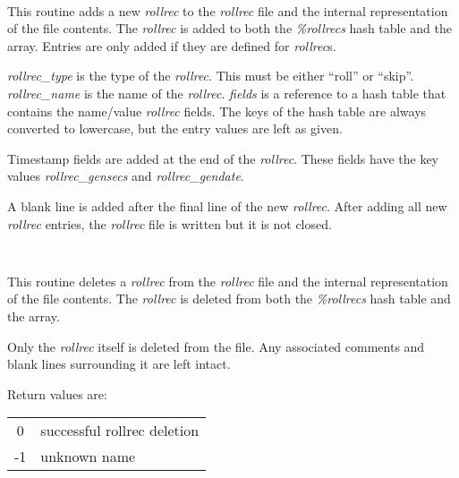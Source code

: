 \begin{description}

\item {}\verb" "

This routine adds a new {\it rollrec} to the {\it rollrec} file and the
internal representation of the file contents.  The {\it rollrec} is added to
both the {\it \%rollrecs} hash table and the {\it \@rollreclines} array.
Entries are only added if they are defined for {\it rollrec}s.

{\it rollrec\_type} is the type of the {\it rollrec}.  This must be either
``roll'' or ``skip''.  {\it rollrec\_name} is the name of the {\it rollrec}.
{\it fields} is a reference to a hash table that contains the name/value {\it
rollrec} fields.  The keys of the hash table are always converted to
lowercase, but the entry values are left as given.

Timestamp fields are added at the end of the {\it rollrec}.  These fields have
the key values {\it rollrec\_gensecs} and {\it rollrec\_gendate}.

A blank line is added after the final line of the new {\it rollrec}.  After
adding all new {\it rollrec} entries, the {\it rollrec} file is written but
it is not closed.

\item {}\verb" "

This routine deletes a {\it rollrec} from the {\it rollrec} file and the
internal representation of the file contents.  The {\it rollrec} is deleted
from both the {\it \%rollrecs} hash table and the {\it \@rollreclines} array.

Only the {\it rollrec} itself is deleted from the file.  Any associated
comments and blank lines surrounding it are left intact.

Return values are:

\begin{table}[ht]
\begin{center}
\begin{tabular}{cl}
0 & successful rollrec deletion \\
-1 & unknown name \\
\end{tabular} 
\end{center}
\end{table}

\item {}\verb" "


\end{description}
